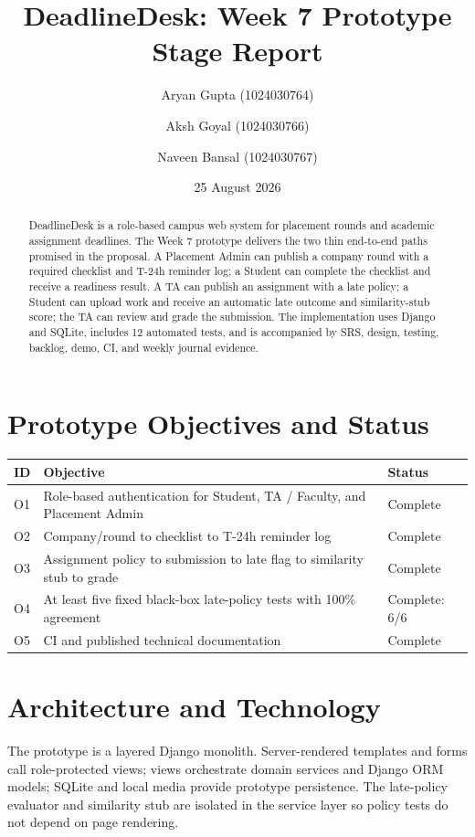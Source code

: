 \documentclass[11pt,a4paper]{article}
\title{DeadlineDesk: Week 7 Prototype Stage Report}
\author{Aryan Gupta (1024030764) \and Aksh Goyal (1024030766) \and Naveen Bansal (1024030767)}
\date{25 August 2026}
\begin{document}
\maketitle

\begin{abstract}
DeadlineDesk is a role-based campus web system for placement rounds and academic assignment deadlines. The Week 7 prototype delivers the two thin end-to-end paths promised in the proposal. A Placement Admin can publish a company round with a required checklist and T-24h reminder log; a Student can complete the checklist and receive a readiness result. A TA can publish an assignment with a late policy; a Student can upload work and receive an automatic late outcome and similarity-stub score; the TA can review and grade the submission. The implementation uses Django and SQLite, includes 12 automated tests, and is accompanied by SRS, design, testing, backlog, demo, CI, and weekly journal evidence.
\end{abstract}

\section{Prototype Objectives and Status}

\begin{tabularx}{\textwidth}{@{}p{0.8cm}X p{2.2cm}@{}}
\toprule
\textbf{ID} & \textbf{Objective} & \textbf{Status} \\
\midrule
O1 & Role-based authentication for Student, TA / Faculty, and Placement Admin & Complete \\
O2 & Company/round to checklist to T-24h reminder log & Complete \\
O3 & Assignment policy to submission to late flag to similarity stub to grade & Complete \\
O4 & At least five fixed black-box late-policy tests with 100\% agreement & Complete: 6/6 \\
O5 & CI and published technical documentation & Complete \\
\bottomrule
\end{tabularx}

\section{Architecture and Technology}

The prototype is a layered Django monolith. Server-rendered templates and forms call role-protected views; views orchestrate domain services and Django ORM models; SQLite and local media provide prototype persistence. The late-policy evaluator and similarity stub are isolated in the service layer so policy tests do not depend on page rendering.
\end{document}
